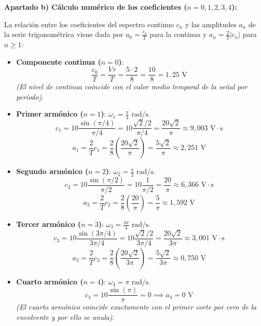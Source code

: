 \begin{problema}
\textbf{Apartado b) Cálculo numérico de los coeficientes ($n = 0, 1, 2, 3, 4$):}

La relación entre los coeficientes del espectro continuo $c_n$ y las amplitudes $a_n$ de la serie trigonométrica viene dada por $a_0 = \frac{c_0}{T}$ para la continua y $a_n = \frac{2}{T} |c_n|$ para $n \ge 1$:

\begin{itemize}[leftmargin=*]
    \item \textbf{Componente continua ($n = 0$)}:
      \[
      \frac{c_0}{T} = \frac{V \tau}{T} = \frac{5 \cdot 2}{8} = \frac{10}{8} = 1{,}25\text{ V}
      \]
      \textit{(El nivel de continua coincide con el valor medio temporal de la señal por período)}.

    \item \textbf{Primer armónico ($n = 1$)}: $\omega_1 = \frac{\pi}{4}\text{ rad/s}$.
      \[
      c_1 = 10 \frac{\sin(\pi/4)}{\pi/4} = 10 \frac{\sqrt{2}/2}{\pi/4} = \frac{20\sqrt{2}}{\pi} \approx 9{,}003\text{ V}\cdot\text{s}
      \]
      \[
      a_1 = \frac{2}{T} c_1 = \frac{2}{8} \left( \frac{20\sqrt{2}}{\pi} \right) = \frac{5\sqrt{2}}{\pi} \approx 2{,}251\text{ V}
      \]

    \item \textbf{Segundo armónico ($n = 2$)}: $\omega_2 = \frac{\pi}{2}\text{ rad/s}$.
      \[
      c_2 = 10 \frac{\sin(\pi/2)}{\pi/2} = 10 \frac{1}{\pi/2} = \frac{20}{\pi} \approx 6{,}366\text{ V}\cdot\text{s}
      \]
      \[
      a_2 = \frac{2}{T} c_2 = \frac{2}{8} \left( \frac{20}{\pi} \right) = \frac{5}{\pi} \approx 1{,}592\text{ V}
      \]

    \item \textbf{Tercer armónico ($n = 3$)}: $\omega_3 = \frac{3\pi}{4}\text{ rad/s}$.
      \[
      c_3 = 10 \frac{\sin(3\pi/4)}{3\pi/4} = 10 \frac{\sqrt{2}/2}{3\pi/4} = \frac{20\sqrt{2}}{3\pi} \approx 3{,}001\text{ V}\cdot\text{s}
      \]
      \[
      a_3 = \frac{2}{T} c_3 = \frac{2}{8} \left( \frac{20\sqrt{2}}{3\pi} \right) = \frac{5\sqrt{2}}{3\pi} \approx 0{,}750\text{ V}
      \]

    \item \textbf{Cuarto armónico ($n = 4$)}: $\omega_4 = \pi\text{ rad/s}$.
      \[
      c_4 = 10 \frac{\sin(\pi)}{\pi} = 0 \implies a_4 = 0\text{ V}
      \]
      \textit{(El cuarto armónico coincide exactamente con el primer corte por cero de la envolvente y por ello se anula)}.
\end{itemize}

\vspace{0.3cm}


\end{problema}
